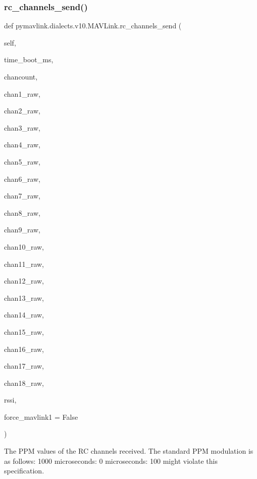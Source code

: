 \begin{DoxyVerb}
\begin{DoxyVerb}
\begin{DoxyVerb}
\begin{DoxyVerb}
\begin{DoxyVerb}
\begin{DoxyVerb}
\begin{DoxyVerb}
\begin{DoxyVerb}
\begin{DoxyVerb}
\subsubsection{\texorpdfstring{rc\+\_\+channels\+\_\+send()}{rc\_channels\_send()}}
{\footnotesize\ttfamily def pymavlink.\+dialects.\+v10.\+M\+A\+V\+Link.\+rc\+\_\+channels\+\_\+send (\begin{DoxyParamCaption}\item[{}]{self,  }\item[{}]{time\+\_\+boot\+\_\+ms,  }\item[{}]{chancount,  }\item[{}]{chan1\+\_\+raw,  }\item[{}]{chan2\+\_\+raw,  }\item[{}]{chan3\+\_\+raw,  }\item[{}]{chan4\+\_\+raw,  }\item[{}]{chan5\+\_\+raw,  }\item[{}]{chan6\+\_\+raw,  }\item[{}]{chan7\+\_\+raw,  }\item[{}]{chan8\+\_\+raw,  }\item[{}]{chan9\+\_\+raw,  }\item[{}]{chan10\+\_\+raw,  }\item[{}]{chan11\+\_\+raw,  }\item[{}]{chan12\+\_\+raw,  }\item[{}]{chan13\+\_\+raw,  }\item[{}]{chan14\+\_\+raw,  }\item[{}]{chan15\+\_\+raw,  }\item[{}]{chan16\+\_\+raw,  }\item[{}]{chan17\+\_\+raw,  }\item[{}]{chan18\+\_\+raw,  }\item[{}]{rssi,  }\item[{}]{force\+\_\+mavlink1 = {\ttfamily False} }\end{DoxyParamCaption})}

\begin{DoxyVerb}The PPM values of the RC channels received. The standard PPM
modulation is as follows: 1000 microseconds: 0%
microseconds: 100%
might violate this specification.


\end{DoxyVerb}
\end{DoxyVerb}
\end{DoxyVerb}
\end{DoxyVerb}
\end{DoxyVerb}
\end{DoxyVerb}
\end{DoxyVerb}
\end{DoxyVerb}
\end{DoxyVerb}
\end{DoxyVerb}
